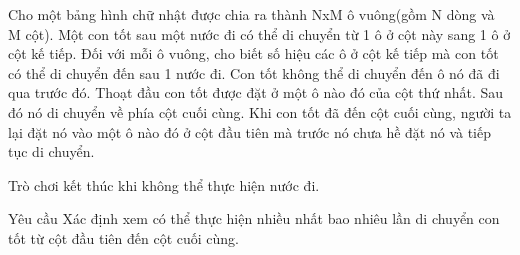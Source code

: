 Cho một bảng hình chữ nhật được chia ra thành NxM ô vuông(gồm N dòng và M cột). Một con tốt sau một nước đi có thể di chuyển từ 1 ô ở cột này sang 1 ô ở cột kế tiếp. Đối với mỗi ô vuông, cho biết số hiệu các ô ở cột kế tiếp mà con tốt có thể di chuyển đến sau 1 nước đi. Con tốt không thể di chuyển đến ô nó đã đi qua trước đó. Thoạt đầu con tốt được đặt ở một ô nào đó của cột thứ nhất. Sau đó nó di chuyển về phía cột cuối cùng. Khi con tốt đã đến cột cuối cùng, người ta lại đặt nó vào một ô nào đó ở cột đầu tiên mà trước nó chưa hề đặt nó và tiếp tục di chuyển.  

   Trò chơi kết thúc khi không thể thực hiện nước đi.  

Yêu cầu
Xác định xem có thể thực hiện nhiều nhất bao nhiêu lần di chuyển con tốt từ cột đầu tiên đến cột cuối cùng.